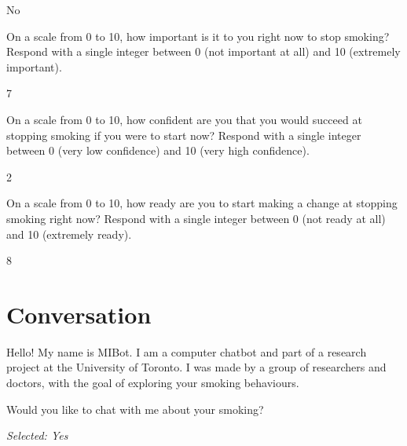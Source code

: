 \begin{clientbox}
No
\end{clientbox}

\begin{researcherbox}
On a scale from 0 to 10, how important is it to you right now to stop smoking? Respond with a single integer between 0 (not important at all) and 10 (extremely important).
\end{researcherbox}

\begin{clientbox}
7
\end{clientbox}

\begin{researcherbox}
On a scale from 0 to 10, how confident are you that you would succeed at stopping smoking if you were to start now? Respond with a single integer between 0 (very low confidence) and 10 (very high confidence).
\end{researcherbox}

\begin{clientbox}
2
\end{clientbox}

\begin{researcherbox}
On a scale from 0 to 10, how ready are you to start making a change at stopping smoking right now? Respond with a single integer between 0 (not ready at all) and 10 (extremely ready).
\end{researcherbox}

\begin{clientbox}
8
\end{clientbox}

\section*{Conversation}

\begin{counsellorbox}
Hello! My name is MIBot. I am a computer chatbot and part of a research project at the University of Toronto. I was made by a group of researchers and doctors, with the goal of exploring your smoking behaviours.
\end{counsellorbox}

\begin{counsellorbox}
Would you like to chat with me about your smoking?
\end{counsellorbox}

\begin{clientbox}
\textit{Selected: Yes}
\end{clientbox}

